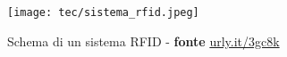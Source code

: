 \begin{figure}[!ht] 
    \centering 
    \texttt{[image: tec/sistema\_rfid.jpeg]} 
    \caption{Schema di un sistema RFID - \textbf{fonte} \url{urly.it/3gc8k}}
    \label{rfid-system}
\end{figure}




    
